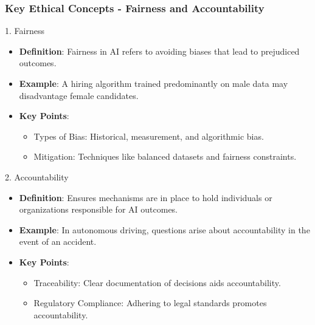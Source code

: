 \documentclass[aspectratio=169]{beamer}
\begin{document}
\begin{frame}[fragile]
    \frametitle{Key Ethical Concepts - Fairness and Accountability}
    \begin{block}{1. Fairness}
        \begin{itemize}
            \item \textbf{Definition}: Fairness in AI refers to avoiding biases that lead to prejudiced outcomes.
            \item \textbf{Example}: A hiring algorithm trained predominantly on male data may disadvantage female candidates.
            \item \textbf{Key Points}:
            \begin{itemize}
                \item Types of Bias: Historical, measurement, and algorithmic bias.
                \item Mitigation: Techniques like balanced datasets and fairness constraints.
            \end{itemize}
        \end{itemize}
    \end{block}

    \begin{block}{2. Accountability}
        \begin{itemize}
            \item \textbf{Definition}: Ensures mechanisms are in place to hold individuals or organizations responsible for AI outcomes.
            \item \textbf{Example}: In autonomous driving, questions arise about accountability in the event of an accident.
            \item \textbf{Key Points}:
            \begin{itemize}
                \item Traceability: Clear documentation of decisions aids accountability.
                \item Regulatory Compliance: Adhering to legal standards promotes accountability.
            \end{itemize}
        \end{itemize}
    \end{block}
\end{frame}
\end{document}
